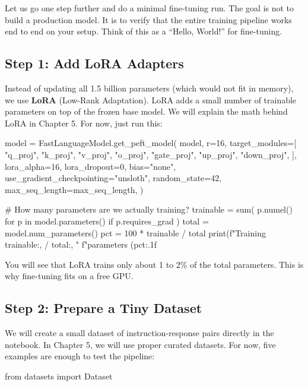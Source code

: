 \begin{chapterenv}
Let us go one step further and do a minimal fine-tuning run. The goal is not to build a production model. It is to verify that the entire training pipeline works end to end on your setup. Think of this as a ``Hello, World!'' for fine-tuning.

\subsection{Step 1: Add LoRA Adapters}

Instead of updating all 1.5 billion parameters (which would not fit in memory), we use \textbf{LoRA} (Low-Rank Adaptation). LoRA adds a small number of trainable parameters on top of the frozen base model. We will explain the math behind LoRA in Chapter 5. For now, just run this:

\begin{codeblock}[python]
model = FastLanguageModel.get_peft_model(
    model,
    r=16,
    target_modules=[
        "q_proj", "k_proj", "v_proj", "o_proj",
        "gate_proj", "up_proj", "down_proj",
    ],
    lora_alpha=16,
    lora_dropout=0,
    bias="none",
    use_gradient_checkpointing="unsloth",
    random_state=42,
    max_seq_length=max_seq_length,
)

# How many parameters are we actually training?
trainable = sum(
    p.numel() for p in model.parameters()
    if p.requires_grad
)
total = model.num_parameters()
pct = 100 * trainable / total
print(f"Training {trainable:,} / {total:,} "
      f"parameters ({pct:.1f}%
\end{codeblock}

You will see that LoRA trains only about 1 to 2\% of the total parameters. This is why fine-tuning fits on a free GPU.

\subsection{Step 2: Prepare a Tiny Dataset}

We will create a small dataset of instruction-response pairs directly in the notebook. In Chapter 5, we will use proper curated datasets. For now, five examples are enough to test the pipeline:

\begin{codeblock}[python]
from datasets import Dataset


\end{codeblock}
\end{chapterenv}
